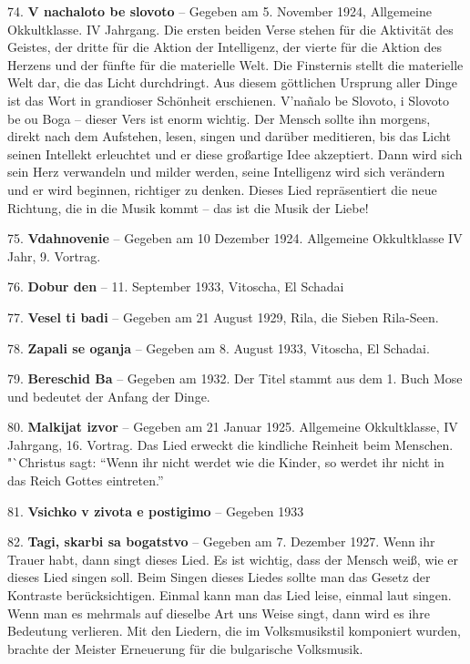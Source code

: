 \documentclass[11pt,a5paper,twoside]{article}
\begin{document}
74. \textbf{V nachaloto be slovoto} -- Gegeben am 5. November 1924, Allgemeine Okkultklasse. IV Jahrgang. Die ersten beiden Verse stehen für die Aktivität des Geistes, der dritte für die Aktion der Intelligenz, der vierte für die Aktion des Herzens und der fünfte für die materielle Welt. Die Finsternis stellt die materielle Welt dar, die das Licht durchdringt. Aus diesem göttlichen Ursprung aller Dinge ist das Wort in grandioser Schönheit erschienen. V’nañalo be Slovoto, i Slovoto be ou Boga –  dieser Vers ist enorm wichtig. Der Mensch sollte ihn morgens, direkt nach dem Aufstehen, lesen, singen und darüber meditieren, bis das Licht seinen Intellekt erleuchtet und er diese großartige Idee akzeptiert. Dann wird sich sein Herz verwandeln und milder werden, seine Intelligenz wird sich verändern und er wird beginnen, richtiger zu denken. Dieses Lied repräsentiert die neue Richtung, die in die Musik kommt -- das ist die Musik der Liebe!

75. \textbf{Vdahnovenie} -- Gegeben am 10 Dezember 1924. Allgemeine Okkultklasse IV Jahr, 9. Vortrag.

76. \textbf{Dobur den} -- 11. September 1933, Vitoscha, El Schadai

77. \textbf{Vesel ti badi} -- Gegeben am 21 August 1929, Rila, die Sieben Rila-Seen.

78. \textbf{Zapali se oganja} --  Gegeben am 8. August 1933, Vitoscha, El Schadai.

79. \textbf{Bereschid Ba} -- Gegeben am 1932. Der Titel stammt aus dem 1. Buch Mose und bedeutet der Anfang der Dinge.

80. \textbf{Malkijat izvor} -- Gegeben am 21 Januar 1925. Allgemeine Okkultklasse, IV Jahrgang, 16. Vortrag. Das Lied erweckt die kindliche Reinheit beim Menschen. "`Christus sagt: "`Wenn ihr nicht werdet wie die Kinder, so werdet ihr nicht in das Reich Gottes eintreten."'

81. \textbf{Vsichko v zivota e postigimo} -- Gegeben 1933

82. \textbf{Tagi, skarbi sa bogatstvo} -- Gegeben am 7. Dezember 1927. Wenn ihr Trauer habt, dann singt dieses Lied. Es ist wichtig, dass der Mensch weiß, wie er dieses Lied singen soll. Beim Singen dieses Liedes sollte man das Gesetz der Kontraste berücksichtigen. Einmal kann man das Lied leise, einmal laut singen. Wenn man es mehrmals auf dieselbe Art uns Weise singt, dann wird es ihre Bedeutung verlieren. Mit den Liedern, die im Volksmusikstil komponiert wurden, brachte der Meister Erneuerung für die bulgarische Volksmusik. 
\end{document}

